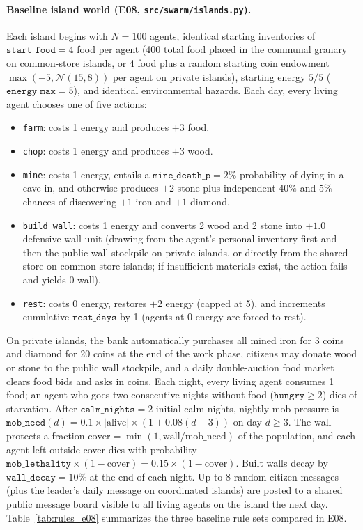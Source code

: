\documentclass[10pt,letterpaper]{article}
\begin{document}
\paragraph{Baseline island world (E08, \texttt{src/swarm/islands.py}).}
Each island begins with $N=100$ agents, identical starting inventories of $\texttt{start\_food}=4$ food per agent (400 total food placed in the communal granary on common-store islands, or 4 food plus a random starting coin endowment $\max(-5, \mathcal{N}(15, 8))$ per agent on private islands), starting energy $5/5$ ($\texttt{energy\_max}=5$), and identical environmental hazards. Each day, every living agent chooses one of five actions:
\begin{itemize}[nosep,leftmargin=1.5em]
  \item \texttt{farm}: costs 1 energy and produces $+3$ food.
  \item \texttt{chop}: costs 1 energy and produces $+3$ wood.
  \item \texttt{mine}: costs 1 energy, entails a $\texttt{mine\_death\_p}=2\%$ probability of dying in a cave-in, and otherwise produces $+2$ stone plus independent $40\%$ and $5\%$ chances of discovering $+1$ iron and $+1$ diamond.
  \item \texttt{build\_wall}: costs 1 energy and converts 2 wood and 2 stone into $+1.0$ defensive wall unit (drawing from the agent's personal inventory first and then the public wall stockpile on private islands, or directly from the shared store on common-store islands; if insufficient materials exist, the action fails and yields 0 wall).
  \item \texttt{rest}: costs 0 energy, restores $+2$ energy (capped at 5), and increments cumulative $\texttt{rest\_days}$ by 1 (agents at 0 energy are forced to rest).
\end{itemize}
On private islands, the bank automatically purchases all mined iron for 3 coins and diamond for 20 coins at the end of the work phase, citizens may donate wood or stone to the public wall stockpile, and a daily double-auction food market clears food bids and asks in coins. Each night, every living agent consumes 1 food; an agent who goes two consecutive nights without food ($\texttt{hungry}\ge 2$) dies of starvation. After $\texttt{calm\_nights}=2$ initial calm nights, nightly mob pressure is $\texttt{mob\_need}(d) = 0.1 \times |\text{alive}| \times (1 + 0.08(d - 3))$ on day $d \ge 3$. The wall protects a fraction $\text{cover} = \min(1, \text{wall}/\text{mob\_need})$ of the population, and each agent left outside cover dies with probability $\texttt{mob\_lethality} \times (1 - \text{cover}) = 0.15 \times (1 - \text{cover})$. Built walls decay by $\texttt{wall\_decay}=10\%$ at the end of each night. Up to 8 random citizen messages (plus the leader's daily message on coordinated islands) are posted to a shared public message board visible to all living agents on the island the next day. Table~\ref{tab:rules_e08} summarizes the three baseline rule sets compared in E08.
\end{document}
